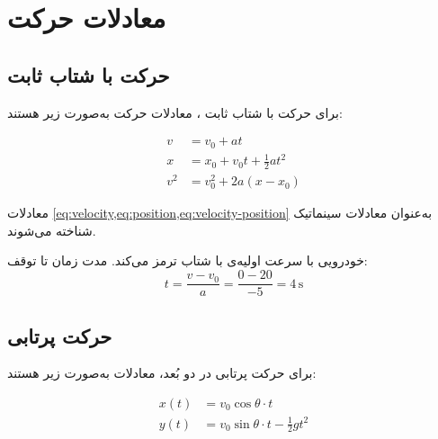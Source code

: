 
\section{معادلات حرکت}
\label{sec:physics-book-equations}

\subsection{حرکت با شتاب ثابت}
\label{sec:physics-book-constant-accel}

برای حرکت با شتاب ثابت ، معادلات
حرکت به‌صورت زیر هستند:

\begin{align}
    v &= v_0 + at \label{eq:velocity} \\
    x &= x_0 + v_0 t + \frac{1}{2} a t^2 \label{eq:position} \\
    v^2 &= v_0^2 + 2a(x - x_0) \label{eq:velocity-position}
\end{align}

معادلات \cref{eq:velocity,eq:position,eq:velocity-position}
به‌عنوان معادلات سینماتیک شناخته می‌شوند.


\begin{example}
    خودرویی با سرعت اولیه‌ی
     با شتاب
     ترمز می‌کند.
    مدت زمان تا توقف:
    \[
        t = \frac{v - v_0}{a} = \frac{0 - 20}{-5} = 4\,\text{s}
    \]
    \label{ex:braking}
\end{example}

\subsection{حرکت پرتابی}
\label{sec:physics-book-projectile}

برای حرکت پرتابی در دو بُعد، معادلات
به‌صورت زیر هستند:

\begin{align}
    x(t) &= v_0 \cos\theta \cdot t \\
    y(t) &= v_0 \sin\theta \cdot t - \frac{1}{2} g t^2
\end{align}


